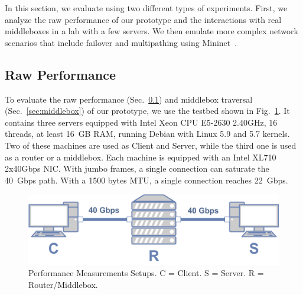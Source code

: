 
In this section, we evaluate \tcpls using two different types of experiments.
First, we analyze the raw performance of our \tcpls prototype and the interactions
with real middleboxes in a lab with a few servers. We then emulate more complex
network scenarios that include failover and multipathing using
Mininet~\cite{handigol2012reproducible}.






\subsection{Raw Performance}
\label{sec:perf}

To evaluate the raw performance (Sec.~\ref{sec:perf}) and middlebox traversal
(Sec.~\ref{sec:middlebox}) of our \tcpls prototype, we use the testbed shown in
Fig.~\ref{fig:perf_testbed}. It contains three servers equipped with Intel Xeon
CPU E5-2630 2.40GHz, 16 threads, at least 16~GB RAM, running Debian with Linux
5.9 and 5.7 kernels. Two of these machines are used as Client and Server, while
the third one is used as a router or a middlebox. Each machine is equipped with
an Intel XL710 2x40Gbps NIC. With jumbo frames, a single \tcp connection can
saturate the 40~Gbps path. With a 1500 bytes MTU, a single connection reaches 22~Gbps.

\begin{figure}[!t]
  \begin{center}
    \includegraphics[width=.7\columnwidth]{figures/testbed.png}
  \end{center}
  \vspace{-0.5cm}
  \caption{Performance Measurements Setups. C = Client. S = Server. R = Router/Middlebox.}
  \label{fig:perf_testbed}
\end{figure}


